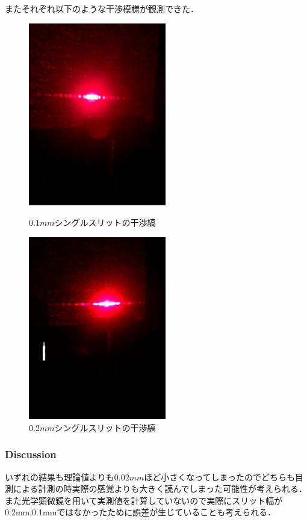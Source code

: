 \documentclass[11pt, a4paper]{jsarticle}
\begin{document}
またそれぞれ以下のような干渉模様が観測できた．
\begin{figure}[htbp]
 \begin{minipage}{0.45\hsize}
  \begin{center}
   \includegraphics[width=60mm]{fig9.png}
  \end{center}
  \caption{$0.1mm$シングルスリットの干渉縞}
  \label{fig:nine}
 \end{minipage}
 \begin{minipage}{0.45\hsize}
  \begin{center}
   \includegraphics[width=60mm]{fig10.png}
  \end{center}
  \caption{$0.2mm$シングルスリットの干渉縞}
  \label{fig:ten}
 \end{minipage}
\end{figure}
\subsubsection{Discussion}
いずれの結果も理論値よりも$0.02mm$ほど小さくなってしまったのでどちらも目測による計測の時実際の感覚よりも大きく読んでしまった可能性が考えられる．
また光学顕微鏡を用いて実測値を計算していないので実際にスリット幅が0.2mm,0.1mmではなかったために誤差が生じていることも考えられる．
\end{document}
